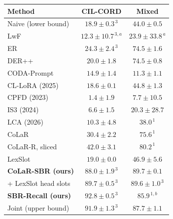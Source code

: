 \begin{tabular}{lcc}
\toprule
\textbf{Method} & \textbf{CIL-CORD} & \textbf{Mixed} \\
\midrule
Naive (lower bound) & $18.9{\pm}0.3^{\,3}$ & $44.0{\pm}0.5$ \\
LwF & $12.3{\pm}10.7^{\,3,a}$ & $23.9{\pm}33.8^{\,a}$ \\
ER & $24.3{\pm}2.4^{\,3}$ & $74.5{\pm}1.6$ \\
DER++ & $20.0{\pm}1.8$ & $74.5{\pm}0.8$ \\
CODA-Prompt & $14.9{\pm}1.4$ & $11.3{\pm}1.1$ \\
CL-LoRA (2025) & $18.6{\pm}0.1$ & $44.8{\pm}1.3$ \\
CPFD (2023) & $1.4{\pm}1.9$ & $7.7{\pm}10.5$ \\
IS3 (2024) & $6.6{\pm}1.5$ & $20.3{\pm}28.7$ \\
LCA (2026) & $10.3{\pm}4.8$ & $38.0^{\,1}$ \\
\midrule
CoLaR & $30.4{\pm}2.2$ & $75.6^{\,1}$ \\
CoLaR-R, sliced & $42.0{\pm}3.1$ & $80.2^{\,1}$ \\
LexSlot & $19.0{\pm}0.0$ & $46.9{\pm}5.6$ \\
\textbf{CoLaR-SBR (ours)} & $88.0{\pm}1.9^{\,3}$ & $\mathbf{89.7{\pm}0.1}$ \\
\quad + LexSlot head slots & $89.7{\pm}0.5^{\,3}$ & $89.6{\pm}1.0^{\,3}$ \\
\textbf{SBR-Recall (ours)} & $\mathbf{92.8{\pm}0.5}^{\,3}$ & $85.9^{\,1,b}$ \\
\midrule
Joint (upper bound) & $91.9{\pm}1.3^{\,3}$ & $87.7{\pm}1.1$ \\
\bottomrule
\end{tabular}
